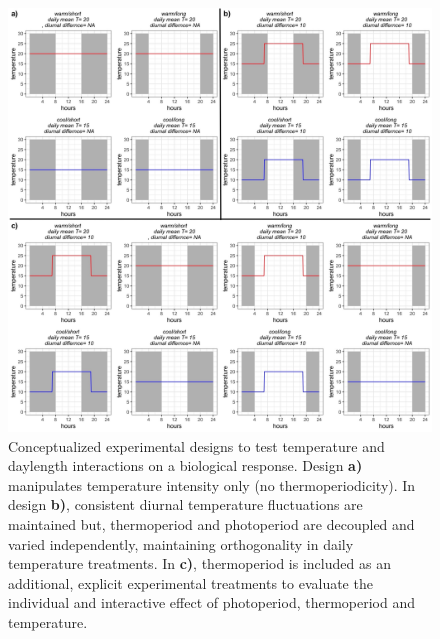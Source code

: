 \documentclass[11pt]{article}
\begin{document}
\begin{figure}[h!]
    \centering
 \includegraphics[width=\textwidth]{..//Plots/periodicity_figures/designs.jpeg}
    \caption{Conceptualized experimental designs to test temperature and daylength interactions on a biological response. Design \textbf{a)}  manipulates temperature intensity only (no thermoperiodicity). In design \textbf{b)}, consistent diurnal temperature fluctuations are maintained but, thermoperiod and photoperiod are decoupled and varied independently, maintaining orthogonality in daily temperature treatments. In \textbf{c)}, thermoperiod is included as an additional, explicit experimental treatments to evaluate the individual and interactive effect of photoperiod, thermoperiod and temperature.}
    \label{fig:designs}
\end{figure}
 
\end{document}
